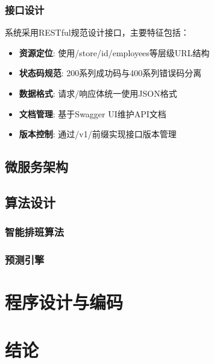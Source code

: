 \documentclass{ctexart}
\begin{document}
\subsubsection{接口设计}
系统采用RESTful规范设计接口，主要特征包括：
\begin{itemize}
    \item \textbf{资源定位}: 使用/store/{id}/employees等层级URL结构
    \item \textbf{状态码规范}: 200系列成功码与400系列错误码分离
    \item \textbf{数据格式}: 请求/响应体统一使用JSON格式
    \item \textbf{文档管理}: 基于Swagger UI维护API文档
    \item \textbf{版本控制}: 通过/v1/前缀实现接口版本管理
\end{itemize}
\subsection{微服务架构}
\subsection{算法设计}
\subsubsection{智能排班算法}
\subsubsection{预测引擎}

\section{程序设计与编码}

\section{结论}
\end{document}
